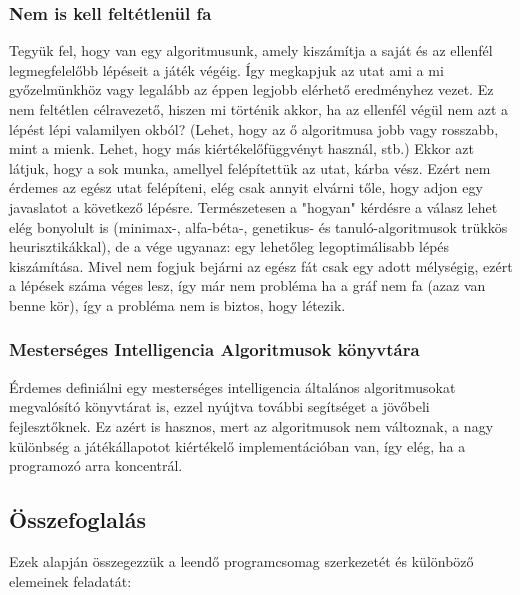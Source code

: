 \documentclass[twoside, a4paper, 12pt]{article}
\begin{document}
\subsubsection{Nem is kell feltétlenül fa}
Tegyük fel, hogy van egy algoritmusunk, amely kiszámítja a saját és az ellenfél legmegfelelőbb lépéseit a játék végéig. Így megkapjuk az utat ami a mi győzelmünkhöz vagy legalább az éppen legjobb elérhető eredményhez vezet. Ez nem feltétlen célravezető, hiszen mi történik akkor, ha az ellenfél végül nem azt a lépést lépi valamilyen okból? (Lehet, hogy az ő algoritmusa jobb vagy rosszabb, mint a mienk. Lehet, hogy más kiértékelőfüggvényt használ, stb.) Ekkor azt látjuk, hogy a sok munka, amellyel felépítettük az utat, kárba vész. Ezért nem érdemes az egész utat felépíteni, elég csak annyit elvárni tőle, hogy adjon egy javaslatot a következő lépésre. Természetesen a "hogyan" kérdésre a válasz lehet elég bonyolult is (minimax-, alfa-béta-, genetikus- és tanuló-algoritmusok trükkös heurisztikákkal), de a vége ugyanaz: egy lehetőleg legoptimálisabb lépés kiszámítása. Mivel nem fogjuk bejárni az egész fát csak egy adott mélységig, ezért a lépések száma véges lesz, így már nem probléma ha a gráf nem fa (azaz van benne kör), így a probléma nem is biztos, hogy létezik.

\subsubsection{Mesterséges Intelligencia Algoritmusok könyvtára}
Érdemes definiálni egy mesterséges intelligencia általános algoritmusokat megvalósító könyvtárat is, ezzel nyújtva további segítséget a jövőbeli fejlesztőknek. Ez azért is hasznos, mert az algoritmusok nem változnak, a nagy különbség a játékállapotot kiértékelő implementációban van, így elég, ha a programozó arra koncentrál.

\subsection{Összefoglalás}
Ezek alapján összegezzük a leendő programcsomag szerkezetét és különböző elemeinek feladatát:
\end{document}
